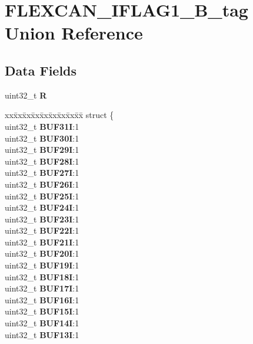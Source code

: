 \hypertarget{unionFLEXCAN__IFLAG1__32B__tag}{}\section{F\+L\+E\+X\+C\+A\+N\+\_\+\+I\+F\+L\+A\+G1\+\_\+B\+\_\+tag Union Reference}
\label{unionFLEXCAN__IFLAG1__32B__tag}
\subsection*{Data Fields}
\begin{DoxyCompactItemize}
\item 
\mbox{\label{unionFLEXCAN__IFLAG1__32B__tag_aae7a2bc4423ee090a8f332a2ae49dd0d}} 
uint32\+\_\+t {\bfseries R}
\item 
\mbox{\label{unionFLEXCAN__IFLAG1__32B__tag_a6199d90a346df2cb629203d444172805}} 
\begin{tabbing}
xx\=xx\=xx\=xx\=xx\=xx\=xx\=xx\=xx\=\kill
struct \{\\
\>uint32\_t {\bfseries BUF31I}:1\\
\>uint32\_t {\bfseries BUF30I}:1\\
\>uint32\_t {\bfseries BUF29I}:1\\
\>uint32\_t {\bfseries BUF28I}:1\\
\>uint32\_t {\bfseries BUF27I}:1\\
\>uint32\_t {\bfseries BUF26I}:1\\
\>uint32\_t {\bfseries BUF25I}:1\\
\>uint32\_t {\bfseries BUF24I}:1\\
\>uint32\_t {\bfseries BUF23I}:1\\
\>uint32\_t {\bfseries BUF22I}:1\\
\>uint32\_t {\bfseries BUF21I}:1\\
\>uint32\_t {\bfseries BUF20I}:1\\
\>uint32\_t {\bfseries BUF19I}:1\\
\>uint32\_t {\bfseries BUF18I}:1\\
\>uint32\_t {\bfseries BUF17I}:1\\
\>uint32\_t {\bfseries BUF16I}:1\\
\>uint32\_t {\bfseries BUF15I}:1\\
\>uint32\_t {\bfseries BUF14I}:1\\
\>uint32\_t {\bfseries BUF13I}:1\\

\end{tabbing}
\end{DoxyCompactItemize}
